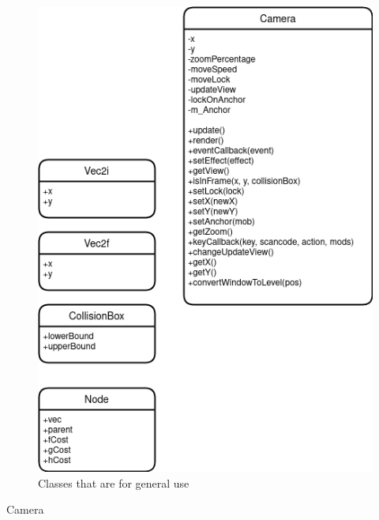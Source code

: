 \documentclass[../Design.tex]{subfiles}
\begin{document}
    \begin{figure}[hbt!]
        \centerline{\includegraphics[scale=0.5]{img/Classes/Other.png}}
        \caption{Classes that are for general use}
        \label{fig}
    \end{figure}
    Camera
\end{document}
